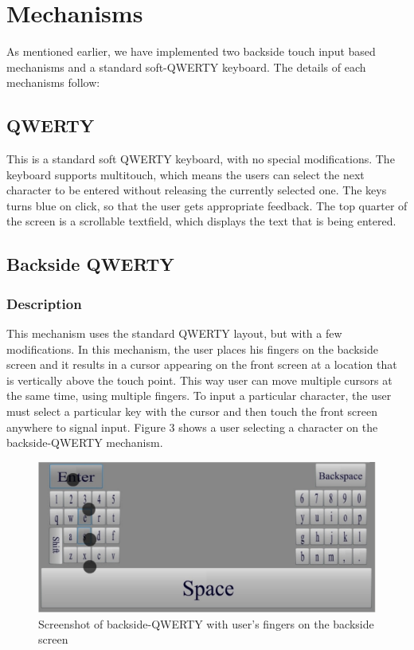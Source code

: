 \section{Mechanisms}

As mentioned earlier, we have implemented two backside touch input based mechanisms and a standard soft-QWERTY keyboard. The details of each mechanisms follow:

\subsection{QWERTY}

This is a standard soft QWERTY keyboard, with no special modifications. The keyboard supports multitouch, which means the users can select the next character to be entered without releasing the currently selected one. The keys turns blue on click, so that the user gets appropriate feedback. The top quarter of the screen is a scrollable textfield, which displays the text that is being entered.

\subsection{Backside QWERTY}
\subsubsection{Description}

This mechanism uses the standard QWERTY layout, but with a few modifications. In this mechanism, the user places his fingers on the backside screen and it results in a cursor appearing on the front screen at a location that is vertically above the touch point. This way user can move multiple cursors at the same time, using multiple fingers. To input a particular character, the user must select a particular key with the cursor and then touch the front screen anywhere to signal input. Figure 3 shows a user selecting a character on the backside-QWERTY mechanism.

\begin{figure}
    \includegraphics[scale=0.45]{Figures/backside.pdf} 
    \caption{Screenshot of backside-QWERTY with user's fingers on the
      backside screen}
\end{figure}

